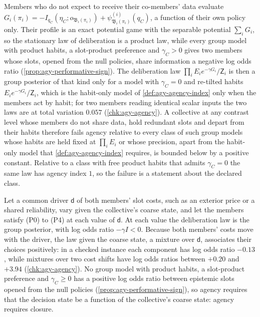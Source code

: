 \begin{example}\label{ex:agy-no-data-sharing}
Members who do not expect to receive their co-members' data evaluate $G_i(\pi_i)=-I_{q_C}(\eta_C;o_{\mathfrak B_i(\pi_i)})+\psi^{(i)}_{\mathfrak B_i(\pi_i)}(q_C)$, a function of their own policy only. Their profile is an exact potential game with the separable potential $\sum_iG_i$, so the stationary law of deliberation is a product law, while every group model with product habits, a slot-product preference and $\gamma_C>0$ gives two members whose slots, opened from the null policies, share information a negative log odds ratio (\cref{prop:agy-performative-sign}). The deliberation law $\prod_iE_ie^{-\gamma G_i}/\mathsf Z_i$ is then a group posterior of that kind only for a model with $\gamma_C=0$ and re-tilted habits $E_ie^{-\gamma G_i}/\mathsf Z_i$, which is the habit-only model of \cref{def:agy-agency-index} only when the members act by habit; for two members reading identical scalar inputs the two laws are at total variation $0.057$ (\cref{chk:agy-agency}). A collective at any contrast level whose members do not share data, hold redundant slots and depart from their habits therefore fails agency relative to every class of such group models whose habits are held fixed at $\prod_iE_i$ or whose precision, apart from the habit-only model that \cref{def:agy-agency-index} requires, is bounded below by a positive constant. Relative to a class with free product habits that admits $\gamma_C=0$ the same law has agency index $1$, so the failure is a statement about the declared class.
\end{example}

\begin{example}\label{ex:agy-unrepresented-driver}
Let a common driver $\mathsf d$ of both members' slot costs, such as an exterior price or a shared reliability, vary given the collective's coarse state, and let the members satisfy (P0) to (P4) at each value of $\mathsf d$. At each value the deliberation law is the group posterior, with log odds ratio $-\gamma I<0$. Because both members' costs move with the driver, the law given the coarse state, a mixture over $\mathsf d$, associates their choices positively: in a checked instance each component has log odds ratio $-0.13$, while mixtures over two cost shifts have log odds ratios between $+0.20$ and $+3.94$ (\cref{chk:agy-agency}). No group model with product habits, a slot-product preference and $\gamma_C\ge0$ has a positive log odds ratio between epistemic slots opened from the null policies (\cref{prop:agy-performative-sign}), so agency requires that the decision state be a function of the collective's coarse state: agency requires closure.
\end{example}

